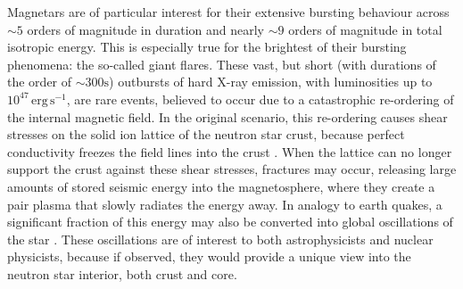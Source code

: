 \documentclass[numberedappendix]{emulateapj}
\begin{document}

Magnetars are of particular interest for their extensive bursting behaviour across $\sim 5$ orders of magnitude in duration and nearly $\sim 9$ orders of magnitude in total isotropic energy. This is especially true for the brightest of their bursting phenomena: the so-called giant flares. These vast, but short (with durations of the order of $\sim 300\mathrm{s}$) outbursts of hard X-ray emission, with luminosities up to $10^{47}\,\mathrm{erg}\, \mathrm{s}^{-1}$, are rare events, believed to occur due to a catastrophic re-ordering of the internal magnetic field. In the original scenario, this re-ordering causes shear stresses on the solid ion lattice of the neutron star crust, because perfect conductivity freezes the field lines into the crust \citep{thompson1995}. When the lattice can no longer support the crust against these shear stresses, fractures may occur, releasing large amounts of stored seismic energy into the magnetosphere, where they create a pair plasma that slowly radiates the energy away. In analogy to earth quakes, a significant fraction of this energy may also be converted into global oscillations of the star \citep{duncan1998}. These oscillations are of interest to both astrophysicists and nuclear physicists, because if observed, they would provide a unique view into the neutron star interior, both crust and core. 
\end{document}
